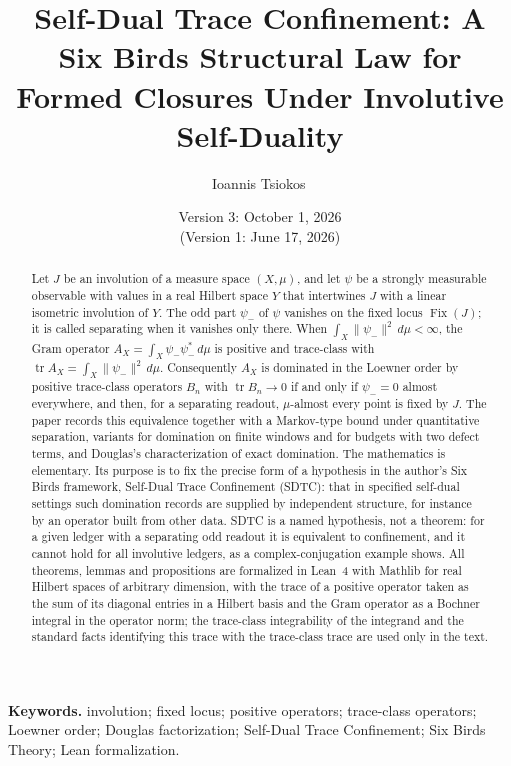 \documentclass[11pt]{article}
\title{Self-Dual Trace Confinement: A Six Birds Structural Law for Formed Closures Under Involutive Self-Duality}
\author{Ioannis Tsiokos\,\orcidlink{0009-0009-7659-5964}}
\date{Version 3: October 1, 2026\\[2pt] \footnotesize (Version 1: June 17, 2026)}
\DeclareMathOperator{\Fix}{Fix}
\DeclareMathOperator{\trace}{tr}
\newcommand{\psim}{\psi_{-}}
\newcommand{\AX}{A_{X}}
\theoremstyle{definition}
\begin{document}
\maketitle
\thispagestyle{firstpage}

\begin{abstract}
Let \(J\) be an involution of a measure space \((X,\mu)\), and let
\(\psi\) be a strongly measurable observable with values in a real
Hilbert space \(Y\) that intertwines \(J\) with a linear isometric
involution of \(Y\).  The odd part \(\psim\) of \(\psi\) vanishes on
the fixed locus \(\Fix(J)\); it is called separating when it vanishes
only there.  When \(\int_X\|\psim\|^2\,d\mu<\infty\), the Gram operator
\(\AX=\int_X\psim\psim^*\,d\mu\) is positive and trace-class with
\(\trace\AX=\int_X\|\psim\|^2\,d\mu\).  Consequently \(\AX\) is
dominated in the Loewner order by positive trace-class operators
\(B_n\) with \(\trace B_n\to0\) if and only if \(\psim=0\) almost
everywhere, and then, for a separating readout, \(\mu\)-almost every
point is fixed by \(J\).  The paper records this equivalence together
with a Markov-type bound under quantitative separation, variants for
domination on finite windows and for budgets with two defect terms,
and Douglas's characterization of exact domination.  The mathematics is
elementary.  Its purpose is to fix the precise form of a hypothesis in
the author's Six Birds framework, Self-Dual Trace Confinement (SDTC):
that in specified self-dual settings such domination records are
supplied by independent structure, for instance by an operator built
from other data.  SDTC is a named hypothesis, not a theorem: for a
given ledger with a separating odd readout it is equivalent to
confinement, and it cannot hold for all involutive ledgers, as a
complex-conjugation example shows.  All theorems, lemmas and
propositions are formalized in Lean~4 with Mathlib for real Hilbert
spaces of arbitrary dimension, with the trace of a positive operator
taken as the sum of its diagonal entries in a Hilbert basis and the
Gram operator as a Bochner integral in the operator norm; the
trace-class integrability of the integrand and the standard facts
identifying this trace with the trace-class trace are used only in the
text.
\end{abstract}

\medskip
\noindent\textbf{Keywords.} involution; fixed locus; positive operators; trace-class operators; Loewner order; Douglas factorization; Self-Dual Trace Confinement; Six Birds Theory; Lean formalization.
\end{document}
